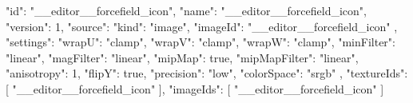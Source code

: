{
  "id": "__editor__forcefield_icon",
  "name": "__editor__forcefield_icon",
  "version": 1,
  "source": {
    "kind": "image",
    "imageId": "__editor__forcefield_icon"
  },
  "settings": {
    "wrapU": "clamp",
    "wrapV": "clamp",
    "wrapW": "clamp",
    "minFilter": "linear",
    "magFilter": "linear",
    "mipMap": true,
    "mipMapFilter": "linear",
    "anisotropy": 1,
    "flipY": true,
    "precision": "low",
    "colorSpace": "srgb"
  },
  "textureIds": [
    "__editor__forcefield_icon"
  ],
  "imageIds": [
    "__editor__forcefield_icon"
  ]
}
